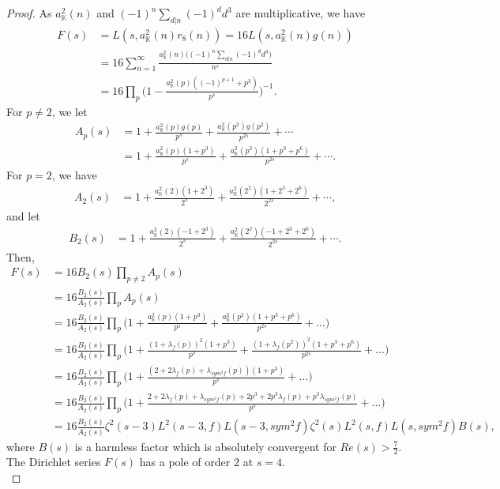 \documentclass[preprint,12pt]{elsarticle}
\numberwithin{equation}{section}
\begin{document}
\begin{proof} 
	As $a_{\mathbb{K}}^{2}(n)$ and $(-1)^{n}\sum_{d|n}(-1)^{d}d^{3}$ are multiplicative, we have
	\begin{align*}
		F(s) &= L(s,a_{\mathbb{K}}^{2}(n)r_{8}(n))=16L(s,a_{\mathbb{K}}^{2}(n)g(n))\\
		&=16\sum_{n=1}^{\infty} \frac{a_{\mathbb{K}}^{2}(n)\big((-1)^{n}\sum_{d|n}(-1)^{d}d^{3}\big)}{n^{s}}\\
		&=16\prod_{p}\Big(1-\frac{a_{\mathbb{K}}^{2}(p)((-1)^{p+1}+p^{3})}{p^{s}}\Big)^{-1}.
	\end{align*}
	For $p\neq 2$, we let
	\begin{align*}
		A_{p}(s)&=1+\frac{a_{\mathbb{K}}^{2}(p)g(p)}{p^{s}}+\frac{a_{\mathbb{K}}^{2}(p^{2})g(p^{2})}{p^{2s}}+\cdots\\
		&=1+\frac{a_{\mathbb{K}}^{2}(p)(1+p^{3})}{p^{s}}+\frac{a_{\mathbb{K}}^{2}(p^{2})(1+p^{3}+p^{6})}{p^{2s}}+\cdots.
	\end{align*} 
	For $p=2$, we have
	\begin{align*}
		A_{2}(s)&=1+\frac{a_{\mathbb{K}}^{2}(2)(1+2^{3})}{2^{s}}+\frac{a_{\mathbb{K}}^{2}(2^{2})(1+2^{3}+2^{6})}{2^{2s}}+\cdots,
	\end{align*}
	and let
	\begin{align*}
		B_{2}(s)&=1+\frac{a_{\mathbb{K}}^{2}(2)(-1+2^{3})}{2^{s}}+\frac{a_{\mathbb{K}}^{2}(2^{2})(-1+2^{3}+2^{6})}{2^{2s}}+\cdots.
	\end{align*}
	Then,
	\begin{align*}
		F(s)&=16 B_{2}(s)\prod_{p\neq 2} A_{p}(s)\\
		&=16\frac{B_{2}(s)}{A_{2}(s)}\prod_{p} A_{p}(s) \\
		&=16\frac{B_{2}(s)}{A_{2}(s)}\prod_{p}\Big(1+\frac{a_{\mathbb{K}}^{2}(p)(1+p^{3})}{p^{s}}+\frac{a_{\mathbb{K}}^{2}(p^{2})(1+p^{3}+p^{6})}{p^{2s}}+\dots\Big)\\
		&=16\frac{B_{2}(s)}{A_{2}(s)}\prod_{p}\Big(1+\frac{(1+\lambda_{f}(p))^{2}(1+p^{3})}{p^{s}}+\frac{(1+\lambda_{f}(p^{2}))^{2}(1+p^{3}+p^{6})}{p^{2s}}+\dots\Big)\\
		&=16\frac{B_{2}(s)}{A_{2}(s)}\prod_{p}\Big(1+\frac{(2+2\lambda_{f}(p)+\lambda_{sym^{2}f}(p))(1+p^{3})}{p^{s}}+\dots\Big)\\
		&=16\frac{B_{2}(s)}{A_{2}(s)}\prod_{p}\Big(1+\frac{2+2\lambda_{f}(p)+\lambda_{sym^{2}f}(p)+2p^{3}+2p^{3}\lambda_{f}(p)+p^{3}\lambda_{sym^{2}f}(p)}{p^{s}}+\dots\Big)\\
		&=16\frac{B_{2}(s)}{A_{2}(s)}\zeta^{2}(s-3)L^{2}(s-3,f)L(s-3,sym^{2}f)\zeta^{2}(s)L^{2}(s,f)L(s,sym^{2}f)B(s),
	\end{align*}
	where $B(s)$ is a harmless factor which is absolutely convergent for $Re(s)>\frac{7}{2}$. The Dirichlet series $F(s)$ has a pole of order $2$ at $s=4$.\\
	

\end{proof}
\end{document}
